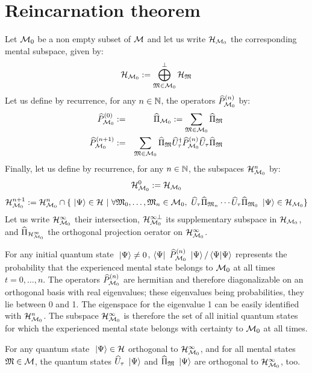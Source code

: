 \section{Reincarnation theorem}

 Let $\mathcal M_0$ be a non empty subset of $\mathcal M$ and let us write $\mathcal H_{\mathcal M_0}$ the corresponding mental subspace, given by:
\begin{equation*}
\mathcal H_{\mathcal M_0} := \bigoplus_{\mathfrak{M} \in \mathcal M_0}^\perp \mathcal H_{\mathfrak{M}}
\end{equation*}
Let us define by recurrence, for any $n \in \mathbb{N}$, the operators $\widehat{P}_{\mathcal M_0}^{(n)}$ by:
\begin{eqnarray*}
\widehat{P}_{\mathcal M_0}^{(0)} & := & \widehat{\Pi}_{\mathcal M_0} := \sum_{\mathfrak{M} \in \mathcal M_0} \widehat{\Pi}_{\mathfrak{M}} \\
\widehat{P}_{\mathcal M_0}^{(n+1)} & := & \sum_{\mathfrak{M} \in \mathcal M_0} \widehat{\Pi}_{\mathfrak{M}} \widehat{U}^{\dagger}_\tau \widehat{P}_{\mathcal M_0}^{(n)} \widehat{U}_\tau \widehat{\Pi}_{\mathfrak{M}}
\end{eqnarray*}
Finally, let us define by recurrence, for any $n \in \mathbb{N}$, the subspaces $\mathcal H_{\mathcal M_0}^n$ by:
\begin{equation*}
\mathcal H_{\mathcal M_0}^0 := \mathcal H_{\mathcal M_0}
\end{equation*}
\begin{equation*}
\mathcal H_{\mathcal M_0}^{n+1} := \mathcal H_{\mathcal M_0}^n \cap \{ \ \left|{\Psi}\right\rangle \in \mathcal H\ |\ \forall \mathfrak{M}_0, \dotsc, \mathfrak{M}_n \in \mathcal M_0,\ \widehat{U}_\tau \widehat{\Pi}_{\mathfrak{M}_n} \dotsm \widehat{U}_\tau \widehat{\Pi}_{\mathfrak{M}_0} \ \left|{\Psi}\right\rangle \in \mathcal H_{\mathcal M_0} \}
\end{equation*}
Let us write $\mathcal H_{\mathcal M_0}^\infty$ their intersection, $\mathcal H_{\mathcal M_0}^{\infty \perp}$ its supplementary subspace in $\mathcal H_{\mathcal M_0}$, and $\widehat{\Pi}_{\mathcal H_{\mathcal M_0}^\infty}$ the orthogonal projection oerator on $\mathcal H_{\mathcal M_0}^\infty$.

 For any initial quantum state $\ \left|{\Psi}\right\rangle \neq 0$, $\left\langle{\Psi}\right|\  \widehat{P}_{\mathcal M_0}^{(n)} \ \left|{\Psi}\right\rangle / \left\langle{\Psi}|{\Psi}\right\rangle$ represents the probability that the experienced mental state belongs to $\mathcal M_0$ at all times $t = 0, \dotsc, n$. The operators $\widehat{P}_{\mathcal M_0}^{(n)}$ are hermitian and therefore diagonalizable on an orthogonal basis with real eigenvalues; these eigenvalues being probabilities, they lie between 0 and 1. The eigenspace for the eigenvalue 1 can be easily identified with $\mathcal H_{\mathcal M_0}^n$. The subspace $\mathcal H_{\mathcal M_0}^\infty$ is therefore the set of all initial quantum states for which the experienced mental state belongs with certainty to $\mathcal M_0$ at all times.

 For any quantum state $\ \left|{\Psi}\right\rangle \in \mathcal H$ orthogonal to $\mathcal H_{\mathcal M_0}^\infty$, and for all mental states $\mathfrak{M} \in \mathcal M$, the quantum states $\widehat{U}_\tau \ \left|{\Psi}\right\rangle$ and $\widehat{\Pi}_{\mathfrak{M}} \ \left|{\Psi}\right\rangle$ are orthogonal to $\mathcal H_{\mathcal M_0}^\infty$, too.

